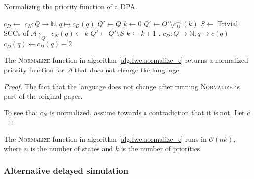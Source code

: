 \begin{algorithm}
  \caption{Normalizing the priority function of a DPA.}
  \label{alg:fwe:normalize_c}
  \begin{algorithmic}[1]
      \State $c_D \gets $
      \State $c_N : Q \rightarrow \mathbb{N}, q \mapsto c_D(q)$
      \State $Q' \gets Q$
      \State $k \gets 0$
        \State $Q' \gets Q' \setminus c_D^{-1}(k)$
        \State $S \gets $ Trivial SCCs of $\mathcal{A}\upharpoonright_{Q'}$
          \State $c_N(q) \gets k$
        \EndFor
        \State $Q' \gets Q' \setminus S$
        \State $k \gets k+1$
      \EndWhile
      \State {}
    \EndFunction
    \Statex
      .
      \State $c_D : Q \rightarrow \mathbb{N}, q \mapsto c(q)$
            \State $c_D(q) \gets c_D(q) - 2$
          \EndFor
        \EndWhile
      \EndFor
      \State {}
    \EndFunction
  \end{algorithmic}
\end{algorithm}

\begin{lem}
	The \textsc{Normalize} function in algorithm \ref{alg:fwe:normalize_c} returns a normalized priority function for $\mathcal{A}$ that does not change the language.
\end{lem}

\begin{proof}
	The fact that the language does not change after running \textsc{Normalize} is part of the original paper.
	
	To see that $c_N$ is normalized, assume towards a contradiction that it is not. Let $c$
\end{proof}


\begin{lem}
	The \textsc{Normalize} function in algorithm \ref{alg:fwe:normalize_c} runs in $\mathcal{O}(nk)$, where $n$ is the number of states and $k$ is the number of priorities.
\end{lem}



\subsubsection{Alternative delayed simulation}

